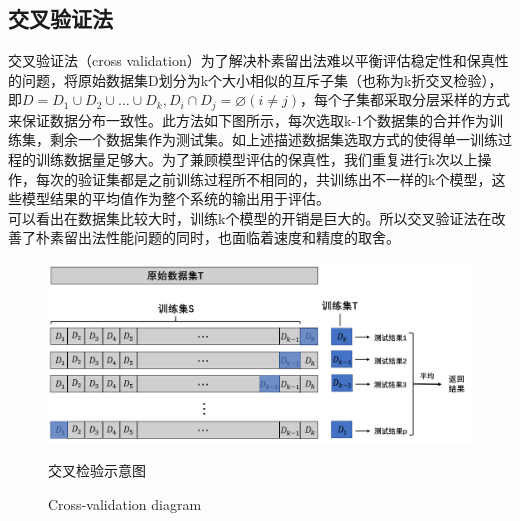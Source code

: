  \subsection{交叉验证法}
 \indent 交叉验证法（cross validation）为了解决朴素留出法难以平衡评估稳定性和保真性的问题，将原始数据集D划分为k个大小相似的互斥子集（也称为k折交叉检验），即$D=D_{1} \cup D_{2} \cup \ldots \cup D_{k}, D_{i} \cap D_{j}=\varnothing(i \neq j)$，每个子集都采取分层采样的方式来保证数据分布一致性。此方法如下图所示，每次选取k-1个数据集的合并作为训练集，剩余一个数据集作为测试集。如上述描述数据集选取方式的使得单一训练过程的训练数据量足够大。为了兼顾模型评估的保真性，我们重复进行k次以上操作，每次的验证集都是之前训练过程所不相同的，共训练出不一样的k个模型，这些模型结果的平均值作为整个系统的输出用于评估。\\
 \indent 可以看出在数据集比较大时，训练k个模型的开销是巨大的。所以交叉验证法在改善了朴素留出法性能问题的同时，也面临着速度和精度的取舍。\\
\begin{figure}[!h] 
\centering 
\includegraphics[width=0.95\linewidth]{img/cv.jpg} 
\renewcommand{\figurename}{图} 
\caption{交叉检验示意图} 
\addtocounter{figure}{-1} \vspace{-5pt} 
\renewcommand{\figurename}{Fig} 
\caption{Cross-validation diagram} 
\renewcommand{\figurename}{图} 
\label{fig:network-device-influence.png} 
\end{figure}
